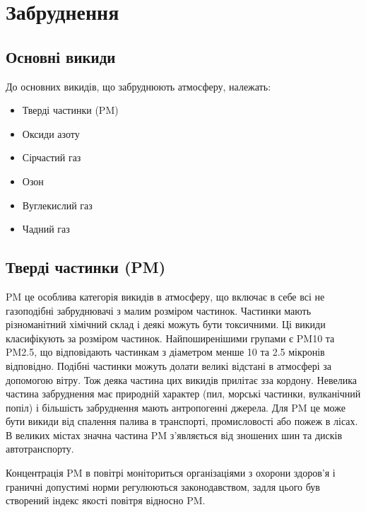 \chapter{Забруднення}

\section{Основні викиди}

До основних викидів, що забруднюють атмосферу, належать:
\begin{itemize}
    \item Тверді частинки (PM)
    \item Оксиди азоту
    \item Сірчастий газ
    \item Озон
    \item Вуглекислий газ
    \item Чадний газ
\end{itemize}

\section{Тверді частинки (PM)}

PM це особлива категорія викидів в атмосферу, що включає в себе всі не газоподібні забруднювачі 
з малим розміром частинок. Частинки мають різноманітний хімічний склад і деякі можуть бути 
токсичними. Ці викиди класифікують за розміром частинок. 
Найпоширенішими групами є PM10 та PM2.5, що відповідають частинкам з діаметром менше 10 
та 2.5 мікронів відповідно. 
Подібні частинки можуть долати великі відстані в атмосфері за допомогою вітру. 
Тож деяка частина цих викидів прилітає зза кордону. Невелика частина забруднення має природній 
характер (пил, морські частинки, вулканічний попіл) і більшість забруднення мають 
антропогенні джерела. Для PM це може бути викиди від спалення палива в транспорті, 
промисловості або пожеж в лісах. В великих містах значна частина PM з'являється від зношених 
шин та дисків автотранспорту.


Концентрація PM в повітрі моніториться організаціями з охорони здоров'я і граничні 
допустимі норми регулюються законодавством, задля цього був створений індекс якості повітря 
відносно PM.

